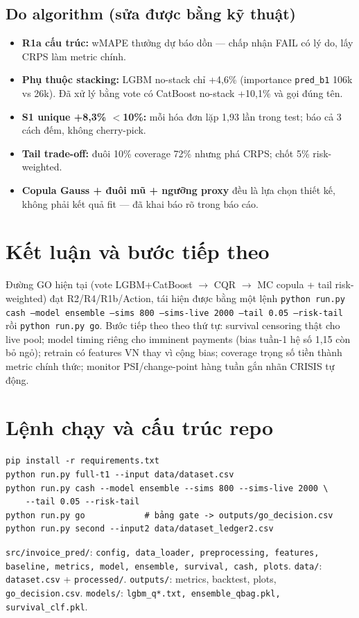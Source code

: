 \documentclass[12pt,a4paper]{article}
\begin{document}
\subsection{Do algorithm (sửa được bằng kỹ thuật)}
\begin{itemize}
\item \textbf{R1a cấu trúc:} wMAPE thưởng dự báo dồn --- chấp nhận FAIL có lý do, lấy CRPS làm metric chính.
\item \textbf{Phụ thuộc stacking:} LGBM no-stack chỉ +4,6\% (importance \texttt{pred\_b1} 106k vs 26k).
Đã xử lý bằng vote có CatBoost no-stack +10,1\% và gọi đúng tên.
\item \textbf{S1 unique +8,3\% $<$10\%:} mỗi hóa đơn lặp 1,93 lần trong test; báo cả 3 cách đếm, không cherry-pick.
\item \textbf{Tail trade-off:} đuôi 10\% coverage 72\% nhưng phá CRPS; chốt 5\% risk-weighted.
\item \textbf{Copula Gauss + đuôi mũ + ngưỡng proxy} đều là lựa chọn thiết kế, không phải kết quả fit ---
đã khai báo rõ trong báo cáo.
\end{itemize}

\section{Kết luận và bước tiếp theo}
\label{sec:conclusion}
Đường GO hiện tại (vote LGBM+CatBoost $\to$ CQR $\to$ MC copula + tail risk-weighted) đạt
R2/R4/R1b/Action, tái hiện được bằng một lệnh
\texttt{python run.py cash --model ensemble --sims 800 --sims-live 2000 --tail 0.05 --risk-tail}
rồi \texttt{python run.py go}. Bước tiếp theo theo thứ tự: survival censoring thật cho live pool;
model timing riêng cho imminent payments (bias tuần-1 hệ số 1,15 còn bỏ ngỏ);
retrain có features VN thay vì cộng bias; coverage trọng số tiền thành metric chính thức;
monitor PSI/change-point hàng tuần gắn nhãn CRISIS tự động.

\appendix
\section{Lệnh chạy và cấu trúc repo}
\begin{verbatim}
pip install -r requirements.txt
python run.py full-t1 --input data/dataset.csv
python run.py cash --model ensemble --sims 800 --sims-live 2000 \
    --tail 0.05 --risk-tail
python run.py go            # bảng gate -> outputs/go_decision.csv
python run.py second --input2 data/dataset_ledger2.csv
\end{verbatim}
\texttt{src/invoice\_pred/}: \texttt{config, data\_loader, preprocessing, features, baseline,
metrics, model, ensemble, survival, cash, plots}. \texttt{data/}: \texttt{dataset.csv} +
\texttt{processed/}. \texttt{outputs/}: metrics, backtest, plots, \texttt{go\_decision.csv}.
\texttt{models/}: \texttt{lgbm\_q*.txt, ensemble\_qbag.pkl, survival\_clf.pkl}.
\end{document}
